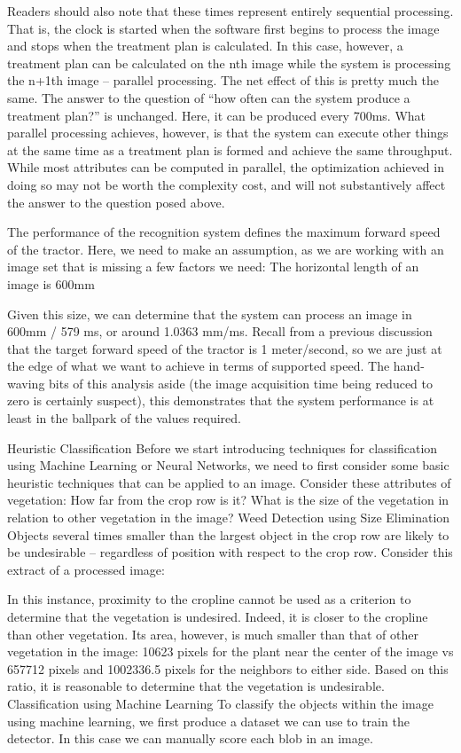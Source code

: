 \documentclass[letterpaper]{article}
\begin{document}
Readers should also note that these times represent entirely sequential processing. That is, the clock is started when the software first begins to process the image and stops when the treatment plan is calculated. In this case, however, a treatment plan can be calculated on the nth image while the system is processing the n+1th image -- parallel processing. The net effect of this is pretty much the same. The answer to the question of “how often can the system produce a treatment plan?” is unchanged. Here, it can be produced every 700ms. What parallel processing achieves, however, is that the system can execute other things at the same time as a treatment plan is formed and achieve the same throughput. While most attributes can be computed in parallel, the optimization achieved in doing so may not be worth the complexity cost, and will not substantively affect the answer to the question posed above.

The performance of the recognition system defines the maximum forward speed of the tractor. Here, we need to make an assumption, as we are working with an image set that is missing a few factors we need:
The horizontal length of an image is 600mm

Given this size, we can determine that the system can process an image in 600mm / 579 ms, or around 1.0363 mm/ms. Recall from a previous discussion that the target forward speed of the tractor is 1 meter/second, so we are just at the edge of what we want to achieve in terms of supported speed. The hand-waving bits of this analysis aside (the image acquisition time being reduced to zero is certainly suspect), this demonstrates that the system performance is at least in the ballpark of the values required.

Heuristic Classification
Before we start introducing techniques for classification using Machine Learning or Neural Networks, we need to first consider some basic heuristic techniques that can be applied to an image.  Consider these attributes of vegetation:
How far from the crop row is it?
What is the size of the vegetation in relation to other vegetation in the image?
Weed Detection using Size Elimination
Objects several times smaller than the largest object in the crop row are likely to be undesirable -- regardless of position with respect to the crop row. Consider this extract of a processed image:



In this instance, proximity to the cropline cannot be used as a criterion to determine that the vegetation is undesired. Indeed, it is closer to the cropline than other vegetation. Its area, however, is much smaller than that of other vegetation in the image: 10623 pixels for the plant near the center of the image vs 657712 pixels and 1002336.5 pixels for the neighbors to either side.
Based on this ratio, it is reasonable to determine that the vegetation is undesirable.
Classification using Machine Learning
To classify the objects within the image using machine learning, we first produce a dataset we can use to train the detector. In this case we can manually score each blob in an image.
\end{document}
